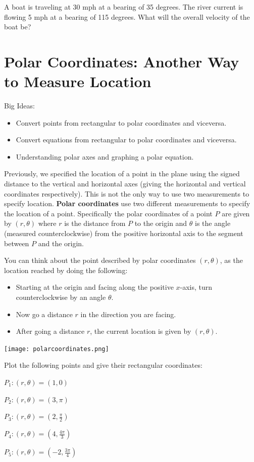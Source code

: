 \bq A boat is traveling at 30 mph at a bearing of 35 degrees. The river current is flowing 5 mph at a bearing of 115 degrees. What will the overall velocity of the boat be?
\eq

\section{Polar Coordinates: Another Way to Measure Location}
Big Ideas:
\begin{itemize}
\item Convert points from rectangular to polar coordinates and viceversa.
\item Convert equations from rectangular to polar coordinates and viceversa.
\item Understanding polar axes and graphing a polar equation.
\end{itemize}

\begin{info}
Previously, we specified the location of a point in the plane using the signed distance to the vertical and horizontal axes (giving the horizontal and vertical coordinates respectively). This is not the only way to use two measurements to specify location. \textbf{Polar coordinates} use two different measurements to specify the location of a point. Specifically the polar coordinates of a point $P$ are given by $(r,\theta)$ where $r$ is the distance from $P$ to the origin and $\theta$ is the angle (measured counterclockwise) from the positive horizontal axis to the segment between $P$ and the origin.

You can think about the point described by polar coordinates $(r,\theta)$, as the location reached by doing the following:
\begin{itemize}
\item Starting at the origin and facing along the positive $x$-axis, turn counterclockwise by an angle $\theta$.
\item Now go a distance $r$ in the direction you are facing.
\item After going a distance $r$, the current location is given by $(r,\theta)$.
\end{itemize}
\begin{center} \texttt{[image: polarcoordinates.png]} \end{center}
\end{info}

\bq Plot the following points and give their rectangular coordinates:
\be
\item $P_1:(r, \theta)=(1,0) $
\item $P_2:(r, \theta)=(3,\pi)$
\item $P_3:(r, \theta)=(2,\frac{\pi}{2})$
\item $P_4:(r, \theta)=(4, \frac{4\pi}{3})$
\item $P_5:(r, \theta)=(-2, \frac{3 \pi}{4})$
\ee
\eq

